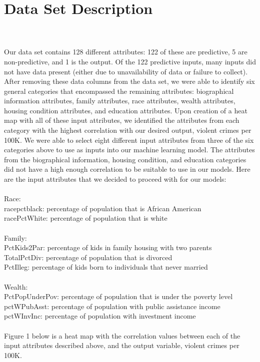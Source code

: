 \documentclass[letterpaper, 11 pt, conference]{article}
\begin{document}
\section{Data Set Description}
\\
\\Our data set contains 128 different attributes: 122 of these are predictive, 5 are non-predictive, and 1 is the output. Of the 122 predictive inputs, many inputs did not have data present (either due to unavailability of data or failure to collect). After removing these data columns from the data set, we were able to identify six general categories that encompassed the remaining attributes: biographical information attributes, family attributes, race attributes, wealth attributes, housing condition attributes, and education attributes. Upon creation of a heat map with all of these input attributes, we identified the attributes from each category with the highest correlation with our desired output, violent crimes per 100K. We were able to select eight different input attributes from three of the six categories above to use as inputs into our machine learning model. The attributes from the biographical information, housing condition, and education categories did not have a high enough correlation to be suitable to use in our models. Here are the input attributes that we decided to proceed with for our models:
\\
\\Race:
\\racepctblack: percentage of population that is African American
\\racePctWhite: percentage of population that is white
\\
\\Family:
\\PctKids2Par: percentage of kids in family housing with two parents
\\TotalPctDiv: percentage of population that is divorced
\\PctIlleg: percentage of kids born to individuals that never married
\\
\\Wealth:
\\PctPopUnderPov: percentage of population that is under the poverty level
\\pctWPubAsst: percentage of population with public assistance income
\\pctWInvInc: percentage of population with investment income
\\
\\Figure 1 below is a heat map with the correlation values between each of the input attributes described above, and the output variable, violent crimes per 100K.
\end{document}
